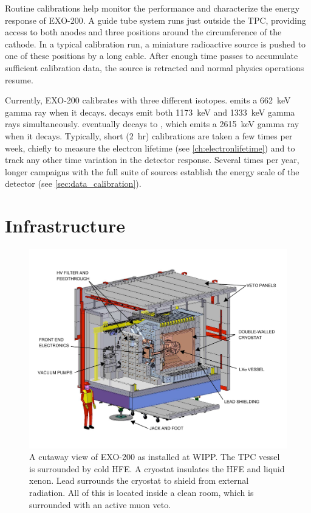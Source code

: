 \documentclass[herrin-thesis.tex]{subfiles}
\begin{document}
Routine calibrations help monitor the performance and characterize the energy response of EXO-200. A guide tube system runs just outside the TPC, providing access to both anodes and three positions around the circumference of the cathode. In a typical calibration run, a miniature radioactive source is pushed to one of these positions by a long cable. After enough time passes to accumulate sufficient calibration data, the source is retracted and normal physics operations resume.

Currently, EXO-200 calibrates with three different isotopes.  emits a \SI{662}{\keV} gamma ray when it decays.  decays emit both \SI{1173}{\keV} and \SI{1333}{\keV} gamma rays simultaneously.  eventually decays to , which emits a \SI{2615}{\keV} gamma ray when it decays. Typically, short (\SI{2}{hr})  calibrations are taken a few times per week, chiefly to measure the electron lifetime (see \cref{ch:electronlifetime}) and to track any other time variation in the detector response. Several times per year, longer campaigns with the full suite of sources establish the energy scale of the detector (see \cref{sec:data_calibration}).

\section{Infrastructure}

\begin{figure}[htbp]
\centering
\includegraphics[width=1.0\textwidth]{./photos/detector_cleanroom.pdf}
\caption[Cutaway view of EXO-200 as installed]{A cutaway view of EXO-200 as installed at WIPP. The TPC vessel is surrounded by cold HFE. A cryostat insulates the HFE and liquid xenon. Lead surrounds the cryostat to shield from external radiation. All of this is located inside a clean room, which is surrounded with an active muon veto.}
\label{fig:detector_cleanroom}
\end{figure}
\end{document}
